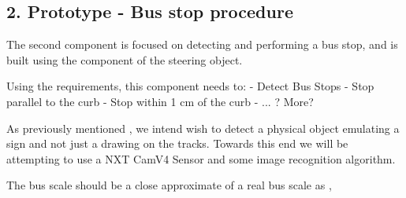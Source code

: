 \subsection{2. Prototype - Bus stop procedure}
The second component is focused on detecting and performing a bus stop, and is built using the component of the steering object. 

Using the requirements, this component needs to:
    - Detect Bus Stops
    - Stop parallel to the curb
    - Stop within 1 cm of the curb
    - ... ? More?

As previously mentioned
, we intend wish to detect a physical object emulating a sign and not just a drawing on the tracks. Towards this end we will be attempting to use a NXT CamV4 Sensor and some image recognition algorithm. 


The bus scale should be a close approximate of a real bus scale as \cite{DriveingCurves}, 